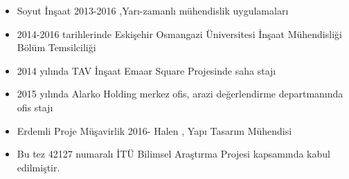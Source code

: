 \begin{itemize}
\item Soyut İnşaat 2013-2016 ,Yarı-zamanlı mühendislik uygulamaları
\item 2014-2016 tarihlerinde Eskişehir Osmangazi Üniversitesi İnşaat Mühendisliği
Bölüm Temsilciliği
\item 2014 yılında TAV İnşaat Emaar Square Projesinde saha stajı
\item 2015 yılında Alarko Holding merkez ofis, arazi değerlendirme departmanında
ofis stajı
\item Erdemli Proje Müşavirlik 2016- Halen , Yapı Tasarım Mühendisi
\item Bu tez 42127 numaralı İTÜ Bilimsel Araştırma Projesi kapsamında kabul
edilmiştir.
\end{itemize}
